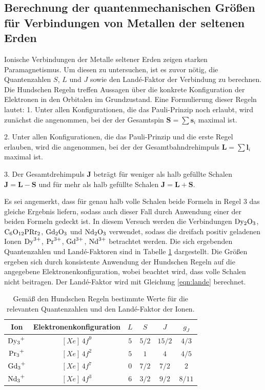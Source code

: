 \subsection{Berechnung der quantenmechanischen Größen für Verbindungen von Metallen der seltenen Erden}
\label{subsec:berechnungquantenzahlenundlande}
Ionische Verbindungen der Metalle seltener Erden zeigen starken Paramagnetismus.
Um diesen zu untersuchen, ist es zuvor nötig, die Quantenzahlen $S$, $L$ und $J$ sowie
den Landé-Faktor der Verbindung zu berechnen. Die Hundschen Regeln treffen Aussagen
über die konkrete Konfiguration der Elektronen in den Orbitalen im Grundzustand.
Eine Formulierung dieser Regeln lautet:
1. Unter allen Konfigurationen, die das Pauli-Prinzip noch erlaubt, wird zunächst die
angenommen, bei der der Gesamtspin $\symbf{S} = \sum \symbf{s}_i$ maximal ist.

2. Unter allen Konfigurationen, die das Pauli-Prinzip und die erste Regel erlauben, wird
die angenommen, bei der der Gesamtbahndrehimpuls $\symbf{L} = \sum \symbf{l}_i$
maximal ist.

3. Der Gesamtdrehimpuls $\symbf{J}$ beträgt für weniger als halb gefüllte Schalen
$\symbf{J} = \symbf{L} - \symbf{S}$ und für mehr als halb gefüllte Schalen
$\symbf{J} = \symbf{L} + \symbf{S}$.

Es sei angemerkt, dass für genau halb volle Schalen beide Formeln in Regel 3 das gleiche
Ergebnis liefern, sodass auch dieser Fall durch Anwendung einer der beiden Formeln
gedeckt ist.
In diesem Versuch werden die Verbindungen $\ce{Dy2O3}$, $\ce{C6O12PRr2}$, $\ce{Gd2O3}$ und $\ce{Nd2O3}$ verwendet, sodass die dreifach positiv geladenen
Ionen $\ce{Dy^{3+}}$, $\ce{Pr^{3+}}$, $\ce{Gd^{3+}}$, $\ce{Nd^{3+}}$ betrachtet werden.
Die sich ergebenden Quantenzahlen und Landé-Faktoren sind in Tabelle \ref{tab:lsjg}
dargestellt. Die Größen ergeben sich durch konsistente Anwendung der Hundschen Regeln
auf die angegebene Elektronenkonfiguration, wobei beachtet wird, dass volle Schalen nicht beitragen.
Der Landé-Faktor wird mit Gleichung \eqref{eqn:lande} berechnet.

\begin{table}[H]
\begin{center}
\caption{Gemäß den Hundschen Regeln bestimmte Werte für die relevanten Quantenzahlen und den Landé-Faktor der Ionen.}
\label{tab:lsjg}
\begin{tabular}{cccccc}
\toprule
Ion & Elektronenkonfiguration & $L$ & $S$ & $J$ & $g_J$\\
\midrule
$\ce{Dy3+}$ & $[Xe] \, 4f^9$ & $5$ & $5/2$ & $15/2$ & $4/3$  \\
$\ce{Pr3+}$ & $[Xe] \, 4f^2$ & $5$ & $1$   & $4$    & $4/5$  \\
$\ce{Gd3+}$ & $[Xe] \, 4f^7$ & $0$ & $7/2$ & $7/2$  & $2$    \\
$\ce{Nd3+}$ & $[Xe] \, 4f^3$ & $6$ & $3/2$ & $9/2$  & $8/11$ \\
\bottomrule
\end{tabular}
\end{center}
\end{table}

